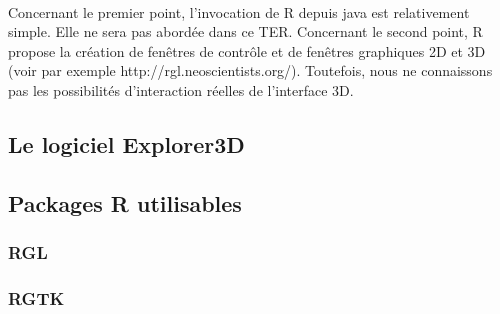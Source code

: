 \paragraph{}
Concernant le premier point, l'invocation de R depuis java est relativement simple. Elle ne sera pas
abordée dans ce TER. Concernant le second point, R propose la création de fenêtres de contrôle et
de fenêtres graphiques 2D et 3D (voir par exemple http://rgl.neoscientists.org/). Toutefois, nous ne
connaissons pas les possibilités d'interaction réelles de l'interface 3D.

\subsection{Le logiciel Explorer3D}
%
\subsection{Packages R utilisables}
\subsubsection{RGL}
%
\subsubsection{RGTK}
%
\newpage